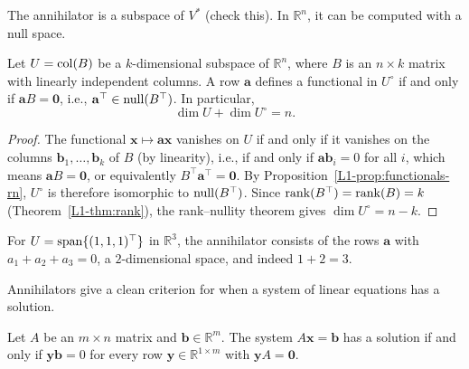 The annihilator is a subspace of $V^*$ (check this). In $\mathbb{R}^n$, it can be computed with a null space.

\begin{theorem}\label{L1-thm:annihilator}
    Let $U = \operatorname{col}(B)$ be a $k$-dimensional subspace of $\mathbb{R}^n$, where $B$ is an $n \times k$ matrix with linearly independent columns. A row $\mathbf{a}$ defines a functional in $U^\circ$ if and only if $\mathbf{a}B = \mathbf{0}$, i.e., $\mathbf{a}^\top \in \operatorname{null}(B^\top)$. In particular,
    \[\dim U + \dim U^\circ = n.\]
\end{theorem}

\begin{proof}
    The functional $\mathbf{x} \mapsto \mathbf{a}\mathbf{x}$ vanishes on $U$ if and only if it vanishes on the columns $\mathbf{b}_1, \ldots, \mathbf{b}_k$ of $B$ (by linearity), i.e., if and only if $\mathbf{a}\mathbf{b}_i = 0$ for all $i$, which means $\mathbf{a}B = \mathbf{0}$, or equivalently $B^\top \mathbf{a}^\top = \mathbf{0}$. By Proposition~\ref{L1-prop:functionals-rn}, $U^\circ$ is therefore isomorphic to $\operatorname{null}(B^\top)$. Since $\operatorname{rank}(B^\top) = \operatorname{rank}(B) = k$ (Theorem~\ref{L1-thm:rank}), the rank--nullity theorem gives $\dim U^\circ = n - k$.
\end{proof}

\begin{example}
    For $U = \operatorname{span}\{(1, 1, 1)^\top\}$ in $\mathbb{R}^3$, the annihilator consists of the rows $\mathbf{a}$ with $a_1 + a_2 + a_3 = 0$, a $2$-dimensional space, and indeed $1 + 2 = 3$.
\end{example}

Annihilators give a clean criterion for when a system of linear equations has a solution.

\begin{theorem}\label{L1-thm:fredholm}
    Let $A$ be an $m \times n$ matrix and $\mathbf{b} \in \mathbb{R}^m$. The system $A\mathbf{x} = \mathbf{b}$ has a solution if and only if $\mathbf{y}\mathbf{b} = 0$ for every row $\mathbf{y} \in \mathbb{R}^{1 \times m}$ with $\mathbf{y}A = \mathbf{0}$.
\end{theorem}

